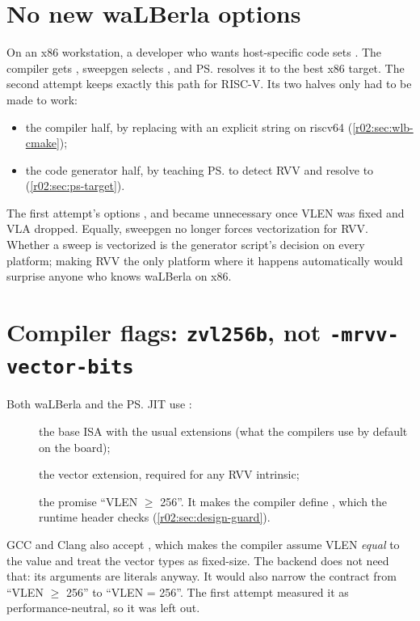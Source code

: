 \section{No new waLBerla options}\label{r02:sec:design-no-options}

On an x86 workstation, a developer who wants host-specific code sets
. The compiler gets ,
sweepgen selects , and \ps{} resolves it to the best x86 target. The
second attempt keeps exactly this path for RISC-V. Its two halves only had to be made to
work:
\begin{itemize}
  \item the compiler half, by replacing  with an explicit string on
        riscv64 (\cref{r02:sec:wlb-cmake});
  \item the code generator half, by teaching \ps{} to detect RVV and resolve
         to  (\cref{r02:sec:ps-target}).
\end{itemize}
The first attempt's options ,  and 
became unnecessary once VLEN was fixed and VLA dropped. Equally, sweepgen no longer
forces vectorization for RVV. Whether a sweep is vectorized is the generator script's
decision on every platform; making RVV the only platform where it happens automatically
would surprise anyone who knows waLBerla on x86.

\section{Compiler flags: \texttt{zvl256b}, not \texttt{-mrvv-vector-bits}}\label{r02:sec:design-flags}

Both waLBerla and the \ps{} JIT use :
\begin{description}
  \item[] the base ISA with the usual extensions (what the compilers use
    by default on the board);
  \item[] the vector extension, required for any RVV intrinsic;
  \item[] the promise ``VLEN $\geq$ 256''. It makes the compiler define
    , which the runtime header checks
    (\cref{r02:sec:design-guard}).
\end{description}
GCC and Clang also accept , which makes the compiler assume
VLEN \emph{equal} to the  value and treat the vector types as fixed-size. The
backend does not need that: its  arguments are literals anyway. It would also
narrow the contract from ``VLEN $\geq$ 256'' to ``VLEN = 256''. The first attempt
measured it as performance-neutral, so it was left out.


